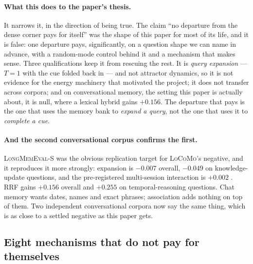 \paragraph{What this does to the paper's thesis.} It narrows it, in the direction of being
true. The claim ``no departure from the dense corner pays for itself'' was the shape of this
paper for most of its life, and it is false: one departure pays, significantly, on a question
shape we can name in advance, with a random-mode control behind it and a mechanism that
makes sense. Three qualifications keep it from rescuing the rest. It is \emph{query
expansion} --- $T{=}1$ with the cue folded back in --- and not attractor dynamics, so it is
not evidence for the energy machinery that motivated the project; it does not transfer
across corpora; and on conversational memory, the setting this paper is actually about, it is
null, where a lexical hybrid gains $+0.156$. The departure that pays is the one that uses
the memory bank to \emph{expand a query}, not the one that uses it to \emph{complete a cue}.

\paragraph{And the second conversational corpus confirms the first.}
\textsc{LongMemEval-S} was the obvious replication target for \textsc{LoCoMo}'s negative,
and it reproduces it more strongly: expansion is $-0.007$  overall,
$-0.049$  on knowledge-update questions, and the pre-registered
multi-session interaction is $+0.002$ . RRF gains $+0.156$
 overall and $+0.255$ on temporal-reasoning questions. Chat memory wants
dates, names and exact phrases; association adds nothing on top of them. Two independent
conversational corpora now say the same thing, which is as close to a settled negative as
this paper gets.

\subsection{Eight mechanisms that do not pay for themselves}
\label{sec:negatives}

